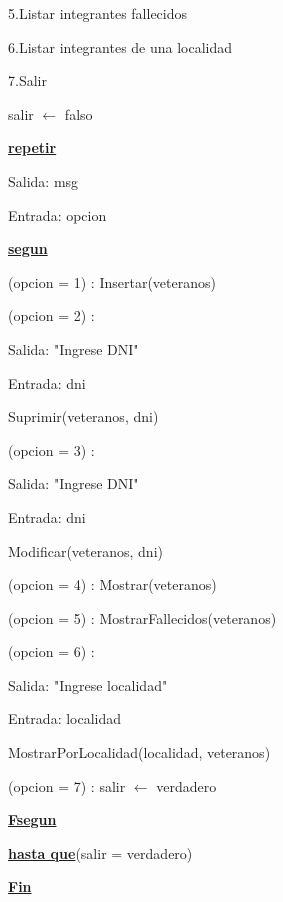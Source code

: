 \documentclass{article}
\begin{document}
        \hspace{17mm}5.Listar integrantes fallecidos

        \hspace{17mm}6.Listar integrantes de una localidad

        \hspace{17mm}7.Salir

    \hspace{4mm}salir $\leftarrow$ falso

    \hspace{4mm}\underline{\textbf{repetir}} 

    \hspace{8mm}Salida: msg

    \hspace{8mm}Entrada: opcion

    \hspace{8mm}\underline{\textbf{segun}}

    \hspace{12mm}(opcion = 1) : Insertar(veteranos)

    \hspace{12mm}(opcion = 2) :

        \hspace{16mm}Salida: "Ingrese DNI"

        \hspace{16mm}Entrada: dni
        
        \hspace{16mm}Suprimir(veteranos, dni)

    \hspace{12mm}(opcion = 3) : 
    
        \hspace{16mm}Salida: "Ingrese DNI"

        \hspace{16mm}Entrada: dni
        
        \hspace{16mm}Modificar(veteranos, dni)

    \hspace{12mm}(opcion = 4) : Mostrar(veteranos)

    \hspace{12mm}(opcion = 5) : MostrarFallecidos(veteranos)

    \hspace{12mm}(opcion = 6) : 
    
        \hspace{16mm}Salida: "Ingrese localidad"

        \hspace{16mm}Entrada: localidad

        \hspace{16mm}MostrarPorLocalidad(localidad, veteranos)

    \hspace{12mm}(opcion = 7) : salir $\leftarrow$ verdadero

    \hspace{8mm}\underline{\textbf{Fsegun}}

    \hspace{4mm}\underline{\textbf{hasta que}}(salir = verdadero)



    \underline{\textbf{Fin}}
\end{document}
